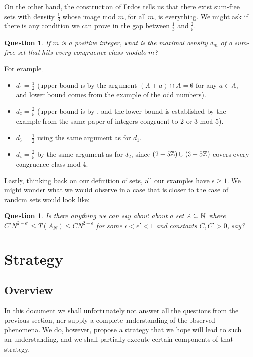 \documentclass{report}
\newtheorem{question}[theorem]{Question}
\theoremstyle{remark}
\numberwithin{equation}{section}
\begin{document}
On the other hand, the construction of Erdos tells us that there exist
sum-free sets with density $\frac13$ whose image mod $m$, for all $m$,
is everything.  We might ask if there is any condition we can prove in
the gap between $\frac13$ and $\frac25$.

\begin{question}\label{qn:irregularity_density}
  If $m$ is a positive integer, what is the maximal density $d_m$ of a
  sum-free set that hits every congruence class modulo $m$?
\end{question}

For example, 

\begin{itemize}
\item $d_1 = \frac12$ (upper bound is by the argument $(A + a) \cap A =
  \emptyset$ for any $a\in A$, and lower bound comes from the example
  of the odd numbers).
\item $d_2 = \frac25$ (upper bound is by
  \cite{luczak:jct1995}, and the lower bound is established
  by the example from the same paper of integers congruent to 2 or 3
  mod 5).
\item $d_3 = \frac12$ using the same argument as for $d_1$.
\item $d_4 = \frac25$ by the same argument as for $d_2$, since
  $(2+5\mathbb{Z}) \cup (3+5\mathbb{Z})$ covers every congruence class mod 4.
\end{itemize}

Lastly, thinking back on our definition of \relevant sets, all our
examples have $\epsilon \geq 1$.  We might wonder what we would
observe in a case that is closer to the case of random sets would look
like: 

\begin{question}
  Is there anything we can say about about a set $A \subseteq \mathbb{N}$
  where $C'N^{2-\epsilon'} \leq T(A_N) \leq CN^{2-\epsilon}$ for some
  $\epsilon < \epsilon' < 1$ and constants $C, C' > 0$, say?
\end{question}

\chapter{Strategy}

\section{Overview}

In this document we shall unfortunately not answer all the questions
from the previous section, nor supply a complete understanding of the
observed phenomena.  We do, however, propose a strategy that we hope
will lead to such an understanding, and we shall partially execute
certain components of that strategy.
\end{document}

